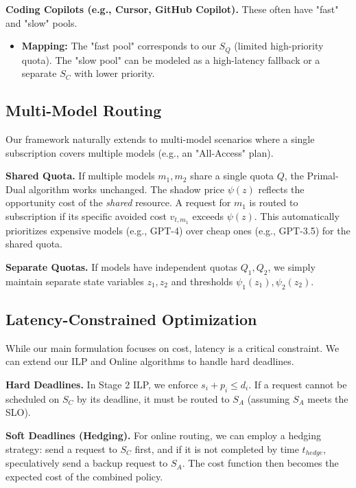 \textbf{Coding Copilots (e.g., Cursor, GitHub Copilot).} These often have "fast" and "slow" pools.
\begin{itemize}
    \item \textbf{Mapping:} The "fast pool" corresponds to our $S_Q$ (limited high-priority quota). The "slow pool" can be modeled as a high-latency fallback or a separate $S_C$ with lower priority.
\end{itemize}

\subsection{Multi-Model Routing}
\label{app:multimodel}

Our framework naturally extends to multi-model scenarios where a single subscription covers multiple models (e.g., an "All-Access" plan).

\textbf{Shared Quota.} If multiple models $m_1, m_2$ share a single quota $Q$, the Primal-Dual algorithm works unchanged. The shadow price $\psi(z)$ reflects the opportunity cost of the \textit{shared} resource. A request for $m_1$ is routed to subscription if its specific avoided cost $v_{t, m_1}$ exceeds $\psi(z)$. This automatically prioritizes expensive models (e.g., GPT-4) over cheap ones (e.g., GPT-3.5) for the shared quota.

\textbf{Separate Quotas.} If models have independent quotas $Q_1, Q_2$, we simply maintain separate state variables $z_1, z_2$ and thresholds $\psi_1(z_1), \psi_2(z_2)$.

\subsection{Latency-Constrained Optimization}
\label{app:latency}

While our main formulation focuses on cost, latency is a critical constraint. We can extend our ILP and Online algorithms to handle hard deadlines.

\textbf{Hard Deadlines.} In Stage 2 ILP, we enforce $s_i + p_i \le d_i$. If a request cannot be scheduled on $S_C$ by its deadline, it must be routed to $S_A$ (assuming $S_A$ meets the SLO).

\textbf{Soft Deadlines (Hedging).} For online routing, we can employ a hedging strategy: send a request to $S_C$ first, and if it is not completed by time $t_{hedge}$, speculatively send a backup request to $S_A$. The cost function then becomes the expected cost of the combined policy.

